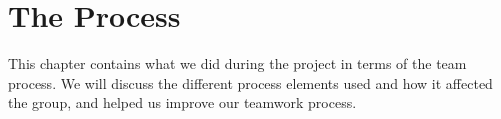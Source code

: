 \chapter{The Process}
This chapter contains what we did during the project in terms of the team process. We will discuss the different process elements used and how it affected the group, and helped us improve our teamwork process.


